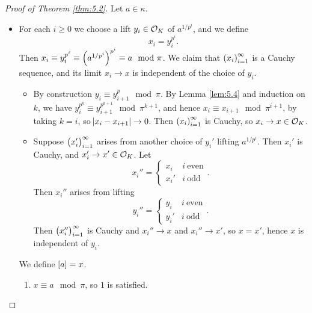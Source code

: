 \begin{proof}[Proof of Theorem \ref{thm:5.2}]
Let $ a \in \kappa $.
\begin{itemize}
\item For each $ i \ge 0 $ we choose a lift $ y_i \in \mathcal{O}_K $ of $ a^{1 / p^i} $, and we define
$$ x_i = y_i^{p^i}. $$
Then $ x_i \equiv y_i^{p^i} \equiv \br{a^{1 / p^i}}^{p^i} \equiv a \mod \pi $. We claim that $ \br{x_i}_{i = 1}^\infty $ is a Cauchy sequence, and its limit $ x_i \to x $ is independent of the choice of $ y_i $.
\begin{itemize}
\item By construction $ y_i \equiv y_{i + 1}^p \mod \pi $. By Lemma \ref{lem:5.4} and induction on $ k $, we have $ y_i^{p^k} \equiv y_{i + 1}^{p^{k + 1}} \mod \pi^{k + 1} $, and hence $ x_i \equiv x_{i + 1} \mod \pi^{i + 1} $, by taking $ k = i $, so $ \abs{x_i - x_{i + 1}} \to 0 $. Then $ \br{x_i}_{i = 1}^\infty $ is Cauchy, so $ x_i \to x \in \mathcal{O}_K $.
\item Suppose $ \br{x_i'}_{i = 1}^\infty $ arises from another choice of $ y_i' $ lifting $ a^{1 / p^i} $. Then $ x_i' $ is Cauchy, and $ x_i' \to x' \in \mathcal{O}_K $. Let
$$ x_i'' =
\begin{cases}
x_i & i \ \text{even} \\
x_i' & i \ \text{odd}
\end{cases}.
$$
Then $ x_i'' $ arises from lifting
$$ y_i'' =
\begin{cases}
y_i & i \ \text{even} \\
y_i' & i \ \text{odd}
\end{cases}.
$$
Then $ \br{x_i''}_{i = 1}^\infty $ is Cauchy and $ x_i'' \to x $ and $ x_i'' \to x' $, so $ x = x' $, hence $ x $ is independent of $ y_i $.
\end{itemize}
We define $ \sbr{a} = x $.
\begin{enumerate}
\item $ x \equiv a \mod \pi $, so $ 1 $ is satisfied.

\pagebreak


\end{enumerate}
\end{itemize}
\end{proof}
